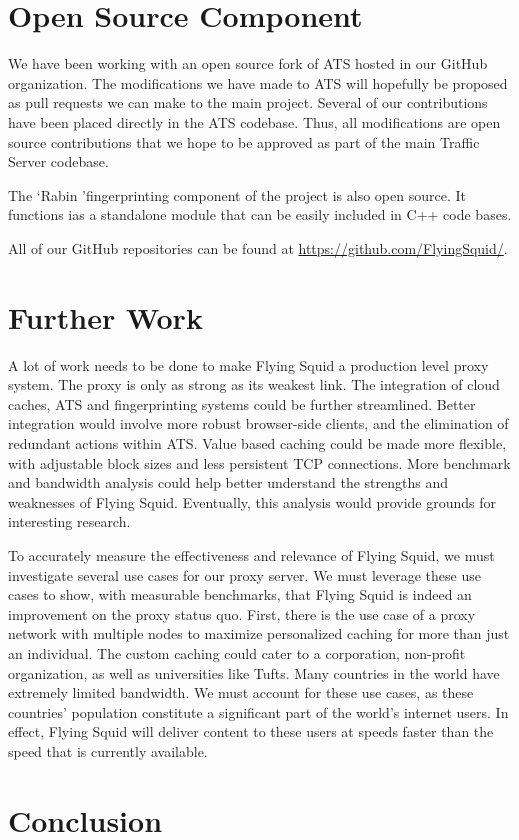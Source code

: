 
\section{Open Source Component}

We have been working with an open source fork of ATS hosted in our GitHub organization. The modifications we have made to ATS will hopefully be proposed as pull requests we can make to the main project. Several of our contributions have been placed directly in the ATS codebase. Thus, all modifications are open source contributions that we hope to be approved as part of the main Traffic Server codebase. 

The \lq Rabin \rq fingerprinting component of the project is also open source. It functions ias a standalone module that can be easily included in C++ code bases.

All of our GitHub repositories can be found at \url{https://github.com/FlyingSquid/}.

\section{Further Work}

A lot of work needs to be done to make Flying Squid a production level proxy system. The proxy is only as strong as its weakest link. The integration of cloud caches, ATS and fingerprinting systems could be further streamlined. Better integration would involve more robust browser-side clients, and the elimination of redundant actions within ATS. Value based caching could be made more flexible, with adjustable block sizes and less persistent TCP connections. More benchmark and bandwidth analysis could help better understand the strengths and weaknesses of Flying Squid. Eventually, this analysis would provide grounds for interesting research.

To accurately measure the effectiveness and relevance of Flying Squid, we must investigate several use cases for our proxy server. We must leverage these use cases to show, with measurable benchmarks, that Flying Squid is indeed an improvement on the proxy status quo. First, there is the use case of a proxy network with multiple nodes to maximize personalized caching for more than just an individual. The custom caching could cater to a corporation, non-profit organization, as well as universities like Tufts. 
Many countries in the world have extremely limited bandwidth. We must account for these use cases, as these countries’ population constitute a significant part of the world’s internet users. In effect, Flying Squid will deliver content to these users at speeds faster than the speed that is currently available.


\section{Conclusion}






